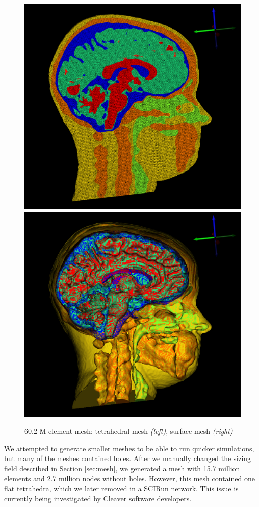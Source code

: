 \begin{figure}[H]
\begin{center}
\includegraphics[width=.49\textwidth]{Figures/bigmesh_1}
\includegraphics[width=.49\textwidth]{Figures/bigmesh_surface}
\caption{60.2 M element mesh: tetrahedral mesh \textit{(left)}, surface mesh \textit{(right)}}
\label{fig:bigmesh}
\end{center}
\end{figure}

We attempted to generate smaller meshes to be able to run quicker simulations, but many of the meshes contained holes. After we manually changed the sizing field described in Section \ref{sec:mesh}, we generated a mesh with 15.7 million elements and 2.7 million nodes without holes. However, this mesh contained one flat tetrahedra, which we later removed in a SCIRun network. This issue is currently being investigated by Cleaver software developers.

